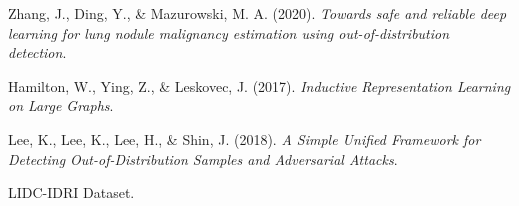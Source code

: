 \documentclass[12pt]{article}
\begin{document}
\begin{enumerate}[label={[\arabic*]}]
    \item Zhang, J., Ding, Y., \& Mazurowski, M. A. (2020). \textit{Towards safe and reliable deep learning for lung nodule malignancy estimation using out-of-distribution detection}.
    \item Hamilton, W., Ying, Z., \& Leskovec, J. (2017). \textit{Inductive Representation Learning on Large Graphs}.
    \item Lee, K., Lee, K., Lee, H., \& Shin, J. (2018). \textit{A Simple Unified Framework for Detecting Out-of-Distribution Samples and Adversarial Attacks}.
    \item LIDC-IDRI Dataset.
\end{enumerate}
\end{document}
